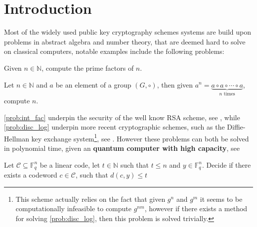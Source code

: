 \chapter{Introduction}
Most of the widely used public key cryptography schemes systems are build upon problems in abstract algebra and number theory, that are deemed hard to solve on classical computers, notable examples include the following problems:
\begin{problem}\label{prob:int_fac}
  Given $n \in \mathbb{N}$, compute the prime factors of $n$.
\end{problem}
\begin{problem}\label{prob:disc_log}
  Let $n \in \mathbb{N}$ and $a$ be an element of a group $(G, \circ)$, then given $a^{n} = \underset{n \text{ times} }{\underbrace{a \circ a \circ \cdots \circ a}}$, compute $n$.
\end{problem}
\autoref{prob:int_fac} underpin the security of the well know RSA scheme, see \cite{alg_lauritzen}, while \autoref{prob:disc_log} underpin more recent cryptographic schemes, such as the Diffie-Hellman key exchange system\footnote{This scheme actually relies on the fact that given $g^{n}$ and $g^{m}$ it seems to be computationally infeasible to compute $g^{nm}$, however if there exists a method for solving \autoref{prob:disc_log}, then this problem is solved trivially.}, see \cite{n_t_and_c}. However these problems can both be solved in polynomial time, given an \textbf{quantum computer with high capacity}, see \cite{shor}


\begin{problem}
  Let $\mathcal{C} \subseteq \mathbb{F}_q^{n}$ be a linear code, let $t \in \mathbb{N}$ such that $t \leq n$ and $y \in \mathbb{F}_q^n$. Decide if there exists a codeword $c \in \mathcal{C}$, such that $d(c, y) \leq t$
\end{problem}

